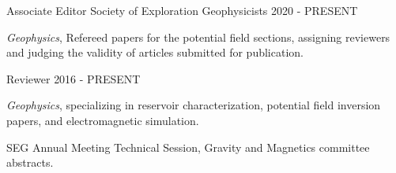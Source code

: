 \begin{cventries}
  \cventry
    {Associate Editor} %
    {Society of Exploration Geophysicists} %
    {} %
    {2020 - PRESENT} %
    {
      \begin{cvitems} %
        \item {{\it Geophysics}, Refereed papers for the potential field sections, assigning reviewers and judging the validity of articles submitted for publication.}
      \end{cvitems}
    }
    
  \cventry
    {Reviewer} %
    {} %
    {} %
    {2016 - PRESENT} %
    {
      \begin{cvitems} %
        \item {{\it Geophysics}, specializing in reservoir characterization, potential field inversion papers, and electromagnetic simulation.}
        \item {SEG Annual Meeting Technical Session, Gravity and Magnetics committee abstracts.}
      \end{cvitems}
    }

\end{cventries}
